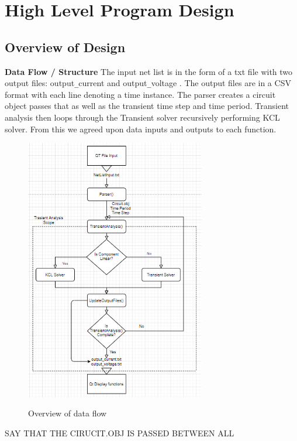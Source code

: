 \documentclass{article}
\begin{document}
\section{High Level Program Design }
\subsection{Overview of Design}
\textbf{Data Flow / Structure}
\newline
The input net list is in the form of a txt file with two output files: output\verb|_|current and output\verb|_|voltage . The output files are in a CSV format with each line denoting a time instance. The parser creates a circuit object passes that as well as the transient time step and time period. Transient analysis then loops through the Transient solver recursively performing KCL solver. From this we agreed upon data inputs and outputs to each function.

\begin{figure}[h]
    \caption{Overview of data flow}
    \centering
    \includegraphics[width=0.7\textwidth]{images/Overview.PNG}
    \label{fig:AlgoOverview}
\end{figure}
SAY THAT THE CIRUCIT.OBJ IS PASSED BETWEEN ALL

\newpage
\end{document}
